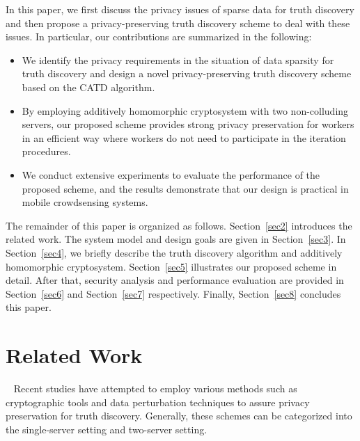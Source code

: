 \documentclass[conference]{IEEEtran}
\begin{document}
In this paper, we first discuss the privacy issues of sparse data for truth discovery and then propose a privacy-preserving truth discovery scheme to deal with these issues.
In particular, our contributions are summarized in the following:
\begin{itemize}
  \item We identify the privacy requirements in the situation of data sparsity for truth discovery and design a novel privacy-preserving truth discovery scheme based on the CATD algorithm.
  \item By employing additively homomorphic cryptosystem with two non-colluding
servers, our proposed scheme provides strong privacy preservation for workers in an efficient way where workers do not need to participate in the iteration procedures.
  \item We conduct extensive experiments to evaluate the performance of the proposed scheme, and the results demonstrate that our design is practical in mobile crowdsensing systems.
\end{itemize}

The remainder of this paper is organized as follows.
Section~\ref{sec2} introduces the related work.
The system model and design goals are given in Section~\ref{sec3}.
In Section~\ref{sec4}, we briefly describe the truth discovery algorithm and additively homomorphic cryptosystem.
Section~\ref{sec5} illustrates our proposed scheme in detail.
After that, security analysis and performance evaluation are provided in Section~\ref{sec6} and Section~\ref{sec7} respectively.
Finally, Section~\ref{sec8} concludes this paper.

\section{Related Work}~\label{sec2}
Recent studies have attempted to employ various methods such as cryptographic tools and data perturbation techniques to assure privacy preservation for truth discovery.
Generally, these schemes can be categorized into the single-server setting and two-server setting.
\end{document}
